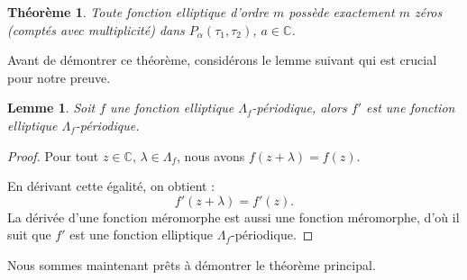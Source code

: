 \documentclass[12pt]{article}
\newtheorem{lemma}{Lemme}
\newtheorem{theorem}{Théorème}
\begin{document}
    \begin{theorem}
        Toute fonction elliptique d'ordre \( m \) possède exactement \( m \) zéros (comptés avec multiplicité) dans \( P_{\alpha}(\tau_1, \tau_2) \), \( a \in \mathbb{C} \).
        \end{theorem}
        Avant de démontrer ce théorème, considérons le lemme suivant qui est crucial pour notre preuve.

        \begin{lemma}
        Soit \( f \) une fonction elliptique \( \Lambda_f \)-périodique, alors \( f' \) est une fonction elliptique \( \Lambda_f \)-périodique.
        \end{lemma}

        \begin{proof}
        Pour tout \( z \in \mathbb{C} \), \( \lambda \in \Lambda_f \), nous avons \( f(z + \lambda) = f(z) \).

        En dérivant cette égalité, on obtient :
        \[
        f'(z + \lambda) = f'(z).
        \]
        La dérivée d'une fonction méromorphe est aussi une fonction méromorphe, d'où il suit que \( f' \) est une fonction elliptique \( \Lambda_f \)-périodique.
        \end{proof}

        Nous sommes maintenant prêts à démontrer le théorème principal.
\end{document}

